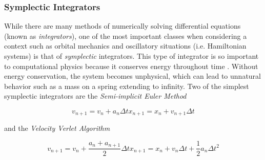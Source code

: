\documentclass{report}
\begin{document}
            \subsubsection{Symplectic Integrators}

                While there are many methods of numerically solving differential equations (known as \emph{integrators}), one of the most important classes when considering a context such as orbital mechanics and oscillatory situations (i.e. Hamiltonian systems) is that of \emph{symplectic} integrators.  This type of integrator is so important to computational physics because it conserves energy throughout time .  Without energy conservation, the system becomes unphysical, which can lead to unnatural behavior such as a mass on a spring extending to infinity.  Two of the simplest symplectic integrators are the \emph{Semi-implicit Euler Method}

                \begin{subequations} \label{eq:semiEuler}
                    \begin{equation}
                        v_{n+1} = v_n + a_n \Delta t
                    \end{equation}
                    \begin{equation}
                        x_{n + 1} = x_n + v_{n+1} \Delta t
                    \end{equation}
                \end{subequations}

                and the \emph{Velocity Verlet Algorithm}

                \begin{subequations} \label{eq:verlet}
                    \begin{equation}
                        v_{n+1} = v_n + \frac{a_n + a_{n+1}}{2} \Delta t
                    \end{equation}
                    \begin{equation}
                        x_{n + 1} = x_n + v_{n} \Delta t + \frac{1}{2} a_n \Delta t^2
                    \end{equation}
                \end{subequations}
\end{document}

